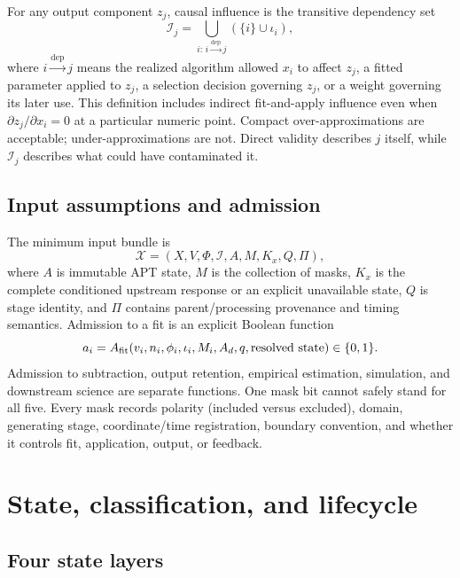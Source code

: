 \documentclass[11pt]{article}
\begin{document}
For any output component $z_j$, causal influence is the transitive dependency
set
\begin{equation}
 \mathcal I_j = \bigcup_{i:\,i\xrightarrow{\mathrm{dep}} j}
   \left(\{i\}\cup\iota_i\right),
 \label{eq:influence-set}
\end{equation}
where $i\xrightarrow{\mathrm{dep}}j$ means the realized algorithm allowed $x_i$ to affect
$z_j$, a fitted parameter applied to $z_j$, a selection decision governing
$z_j$, or a weight governing its later use.  This definition includes
indirect fit-and-apply influence even when $\partial z_j/\partial x_i=0$ at a
particular numeric point.  Compact over-approximations are acceptable;
under-approximations are not.  Direct validity describes $j$ itself, while
$\mathcal I_j$ describes what could have contaminated it.

\subsection{Input assumptions and admission}

The minimum input bundle is
\begin{equation}
 \mathcal X=(X,V,\Phi,\mathcal I,A,M,K_x,Q,\Pi),
 \label{eq:input-bundle}
\end{equation}
where $A$ is immutable APT state, $M$ is the collection of masks, $K_x$ is the
complete conditioned upstream response or an explicit unavailable state,
$Q$ is stage identity, and $\Pi$ contains parent/processing provenance and
timing semantics.  Admission to a fit is an explicit Boolean function
\begin{equation}
 a_i=A_{\rm fit}(v_i,n_i,\phi_i,\iota_i,M_i,A_d,q,
                  \text{resolved state})\in\{0,1\}.
 \label{eq:admission}
\end{equation}
Admission to subtraction, output retention, empirical estimation, simulation,
and downstream science are separate functions.  One mask bit cannot safely
stand for all five.  Every mask records polarity (included versus excluded),
domain, generating stage, coordinate/time registration, boundary convention,
and whether it controls fit, application, output, or feedback.

\section{State, classification, and lifecycle}
\label{sec:state}

\subsection{Four state layers}
\end{document}
